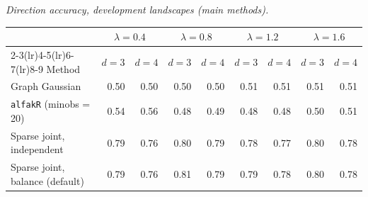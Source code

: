 \par\medskip\noindent\begin{minipage}{\linewidth}
\textit{Direction accuracy, development landscapes (main methods).}
\begin{center}
\footnotesize
\setlength{\tabcolsep}{3.5pt}
\begin{tabular}{l*{8}{r}}
\toprule
 & \multicolumn{2}{c}{$\lambda=0.4$} & \multicolumn{2}{c}{$\lambda=0.8$} & \multicolumn{2}{c}{$\lambda=1.2$} & \multicolumn{2}{c}{$\lambda=1.6$} \\
\cmidrule(lr){2-3}\cmidrule(lr){4-5}\cmidrule(lr){6-7}\cmidrule(lr){8-9}
Method & $d=3$ & $d=4$ & $d=3$ & $d=4$ & $d=3$ & $d=4$ & $d=3$ & $d=4$ \\
\midrule
Graph Gaussian & 0.50 & 0.50 & 0.50 & 0.50 & 0.51 & 0.51 & 0.51 & 0.51 \\
\texttt{alfakR} (minobs = 20) & 0.54 & 0.56 & 0.48 & 0.49 & 0.48 & 0.48 & 0.50 & 0.51 \\
Sparse joint, independent & 0.79 & 0.76 & 0.80 & 0.79 & 0.78 & 0.77 & 0.80 & 0.78 \\
Sparse joint, balance (default) & 0.79 & 0.76 & 0.81 & 0.79 & 0.79 & 0.78 & 0.80 & 0.78 \\
\bottomrule
\end{tabular}
\end{center}
\end{minipage}

